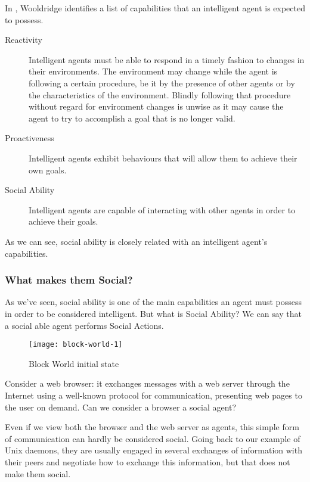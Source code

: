 In \cite{wooldridge:multiagent-systems}, Wooldridge identifies a list of capabilities that an intelligent agent is expected to possess.

\begin{description}
	\item[Reactivity] Intelligent agents must be able to respond in a timely fashion to changes in their environments.
	The environment may change while the agent is following a certain procedure, be it by the presence of other agents or by the characteristics of the environment.
	Blindly following that procedure without regard for environment changes is unwise as it may cause the agent to try to accomplish a goal that is no longer valid.
	\item[Proactiveness] Intelligent agents exhibit behaviours that will allow them to achieve their own goals. 
	\item[Social Ability] Intelligent agents are capable of interacting with other agents in order to achieve their goals.
\end{description}

As we can see, social ability is closely related with an intelligent agent's capabilities.

\subsubsection{What makes them Social?}
As we've seen, social ability is one of the main capabilities an agent must possess in order to be considered intelligent.
But what is Social Ability?
We can say that a social able agent performs Social Actions.

\begin{figure}
  \centering
    \texttt{[image: block-world-1]}
  \caption{Block World initial state}
  \label{fig:block-world-1}
\end{figure}

Consider a web browser: it exchanges messages with a web server through the Internet using a well-known protocol for communication, presenting web pages to the user on demand.
Can we consider a browser a social agent?

Even if we view both the browser and the web server as agents, this simple form of communication can hardly be considered social.
Going back to our example of Unix daemons, they are usually engaged in several exchanges of information with their peers and negotiate how to exchange this information, but that does not make them social.

